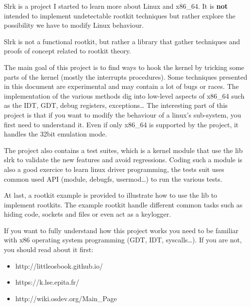 Slrk is a project I started to learn more about Linux and x86\_64.
It is \textbf{not} intended to implement undetectable rootkit techniques but
rather explore the possibility we have to modify Linux behaviour.

Slrk is not a functional rootkit, but rather a library that gather techniques
and proofs of concept related to rootkit theory.

The main goal of this project is to find ways to hook the kernel by tricking
some parts of the kernel (mostly the interrupts procedures).
Some techniques presented in this document are experimental and may contain
a lot of bugs or races.
The implementation of the various methods dig into low-level aspects of
x86\_64 such as the IDT, GDT, debug registers, exceptions…
The interesting part of this project is that if you want to modify the
behaviour of a linux's sub-system, you first need to understand it.
Even if only x86\_64 is supported by the project, it handles the 32bit
emulation mode.

The project also contains a test suites, which is a kernel module that use
the lib slrk to validate the new features and avoid regressions.
Coding such a module is also a good exercice to learn linux driver programming,
the tests suit uses common used API (module, debugfs, usermod…) to run the
various tests.

At last, a rootkit example is provided to illustrate how to use the lib to
implement rootkits. The example rootkit handle different common tasks such
as hiding code, sockets and files or even act as a keylogger.


If you want to fully understand how this project works you need to be familiar
with x86 operating system programming (GDT, IDT, syscalls…). If you are not,
you should read about it first:
\begin{itemize}
  \item http://littleosbook.github.io/
  \item https://k.lse.epita.fr/
  \item http://wiki.osdev.org/Main\_Page
\end{itemize}
